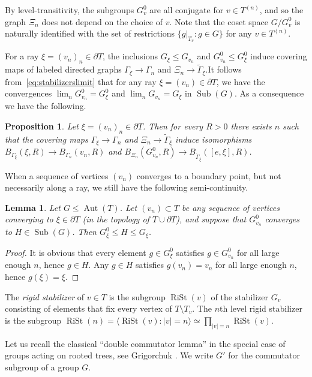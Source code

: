 \documentclass[11pt]{amsart}
\newcommand{\arr}{\longrightarrow}
\newcommand{\sub}{\ensuremath{\operatorname{Sub}}}%
\newcommand{\aut}{\ensuremath{\operatorname{Aut}}}%
\newcommand{\rist}{\ensuremath{\operatorname{RiSt}}}%
\newcommand{\Gammatilde}{\ensuremath{\widetilde{\Gamma}}}%
\theoremstyle{definition}
\theoremstyle{plain}
\newtheorem{main thm}{Theorem}
\newtheorem{prop}[defin]{Proposition}
\newtheorem{lemma}[defin]{Lemma}
\theoremstyle{remark}
\theoremstyle{plain}
\begin{document}
By level-transitivity, the subgroups $G^{0}_v$ are all conjugate for $v\in T^{(n)}$, and so the graph $\Xi_n$ does not depend on the choice of $v$. Note that the coset space $G/G^0_v$ is naturally identified with the set of restrictions $\{g|_{T_v}\colon g\in G\}$ for any $v\in T^{(n)}$. 


For a ray $\xi=(v_n)_n\in \partial T$, the inclusions $G_\xi\le G_{v_n}$ and $G_{v_n}^0\le G_{\xi}^0$ induce covering maps of labeled directed graphs $\Gamma_\xi\arr\Gamma_n$ and $\Xi_n\arr\Gammatilde_{\xi}$.It follows from~\eqref{eq:stabilizerslimit} that for any ray $\xi=(v_n)\in \partial T$,  we have the convergences $\lim_n G^0_{v_n}=G^0_\xi$ and $\lim_n G_{v_n}=G_\xi$ in $\sub(G)$. As a consequence we have the following.

\begin{prop}
\label{pr:convergenceofgraphs}
 Let $\xi=(v_n)_n\in\partial T$. Then for every $R>0$ there exists $n$ such that the covering maps $\Gamma_\xi\arr\Gamma_n$ and $\Xi_n\arr\Gammatilde_\xi$ induce isomorphisms $B_{\Gamma_\xi}(\xi, R)\arr B_{\Gamma_n}(v_n, R)$ and $B_{\Xi_n}(G^0_{v_n}, R)\arr B_{\Gammatilde_\xi}([e,\xi], R)$.
\end{prop}

 When a sequence of vertices $(v_n)$ converges to a boundary point, but not necessarily along a ray, we still have the following semi-continuity.
\begin{lemma}\label{l-semi-continuous}
    Let $G\le \aut(T)$. Let $(v_n)\subset T$ be any sequence of vertices converging to $\xi\in \partial T$ (in the topology of $T\cup \partial T$), and suppose that $G^0_{v_n}$ converges to $H\in \sub(G)$. Then $G^0_\xi\le H\le G_\xi$. 
\end{lemma}
\begin{proof}
It is obvious that every element $g\in G^0_\xi$ satisfies $g\in G^0_{v_n}$ for all large enough $n$, hence $g\in H$. Any $g\in H$ satisfies $g(v_n)=v_n$ for all large enough $n$, hence $g(\xi)=\xi$. \qedhere

\end{proof}




 
 The \emph{rigid stabilizer} of $v\in T$ is the subgroup $\rist(v)$ of the stabilizer $G_v$ consisting of elements that fix every vertex of $T\setminus T_v$. The $n$th level rigid stabilizer is the subgroup $\rist(n)=\langle \rist(v) \colon |v|=n\rangle\simeq \prod_{|v|=n}\rist (v)$. 

  Let us recall the classical ``double commutator lemma'' in the special case of groups acting on rooted trees, see Grigorchuk \cite{Gri-branch}. We write $G'$ for the commutator subgroup of a group $G$. 
\end{document}

